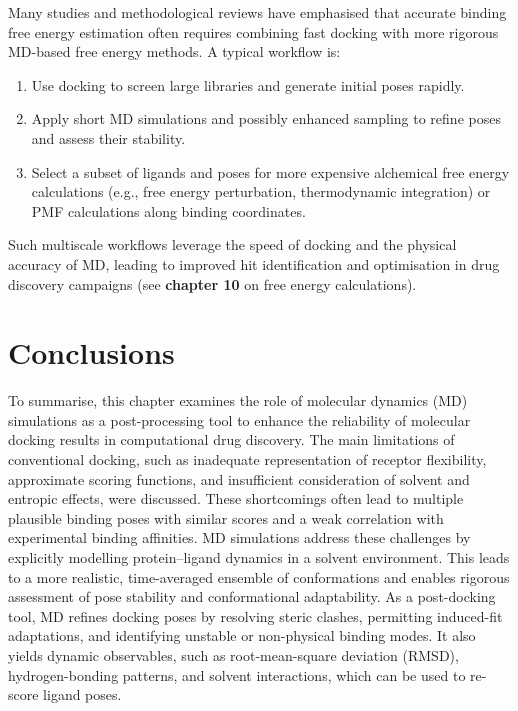 \documentclass[12pt]{article}
\begin{document}
Many studies and methodological reviews\cite{CH9_Cournia2017,CH9_alonso2006}  have emphasised that accurate binding free energy estimation often requires combining fast docking with more rigorous MD-based free energy methods. A typical workflow is:

\begin{enumerate}
\item Use docking to screen large libraries and generate initial poses rapidly.
\item Apply short MD simulations and possibly enhanced sampling to refine poses and assess their stability.
\item Select a subset of ligands and poses for more expensive alchemical free energy calculations (e.g., free energy perturbation, thermodynamic integration) or PMF calculations along binding coordinates.
\end{enumerate}

Such multiscale workflows leverage the speed of docking and the physical accuracy of MD, leading to improved hit identification and optimisation in drug discovery campaigns (see \textbf{chapter 10} on free energy calculations).

\section{Conclusions}

To summarise, this chapter examines the role of molecular dynamics (MD) simulations as a post-processing tool to enhance the reliability of molecular docking results in computational drug discovery. The main limitations of conventional docking, such as inadequate representation of receptor flexibility, approximate scoring functions, and insufficient consideration of solvent and entropic effects, were discussed. These shortcomings often lead to multiple plausible binding poses with similar scores and a weak correlation with experimental binding affinities. MD simulations address these challenges by explicitly modelling protein–ligand dynamics in a solvent environment. This leads to a more realistic, time-averaged ensemble of conformations and enables rigorous assessment of pose stability and conformational adaptability. As a post-docking tool, MD refines docking poses by resolving steric clashes, permitting induced-fit adaptations, and identifying unstable or non-physical binding modes. It also yields dynamic observables, such as root-mean-square deviation (RMSD), hydrogen-bonding patterns, and solvent interactions, which can be used to re-score ligand poses. 
\end{document}
